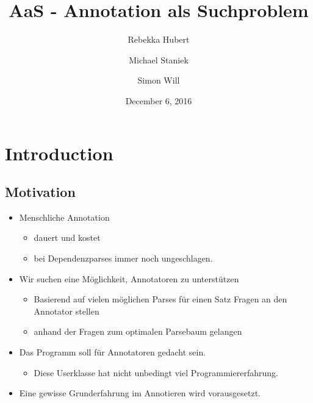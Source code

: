 \documentclass{scrartcl}
\title{AaS - Annotation als Suchproblem}
\author{Rebekka Hubert \and Michael Staniek \and Simon Will}
\date{December 6, 2016}
\begin{document}
\maketitle

\section{Introduction}
\label{sec:Introduction}

\subsection{Motivation}
\label{sub:Motivation}
\begin{itemize}
        \item Menschliche Annotation
            \vspace{5pt}
            \begin{itemize}
                \item dauert und kostet
                    \vspace{5pt}
                \item bei Dependenzparses immer noch ungeschlagen. %
            \end{itemize}
            \vspace{10pt}
        \item Wir suchen eine Möglichkeit, Annotatoren zu unterstützen
            \vspace{5pt}
            \begin{itemize}
                \item Basierend auf vielen möglichen Parses für einen Satz Fragen an den Annotator stellen
                    \vspace{5pt}
                \item anhand der Fragen zum optimalen Parsebaum gelangen
            \end{itemize}
    \end{itemize}

    \begin{itemize}
        \item Das Programm soll für Annotatoren gedacht sein.
            \begin{itemize}
                    \vspace{5pt}
                \item Diese Userklasse hat nicht unbedingt viel Programmiererfahrung.
            \end{itemize}
            \vspace{10pt}
        \item Eine gewisse Grunderfahrung im Annotieren wird vorausgesetzt.
    \end{itemize}
\end{document}
